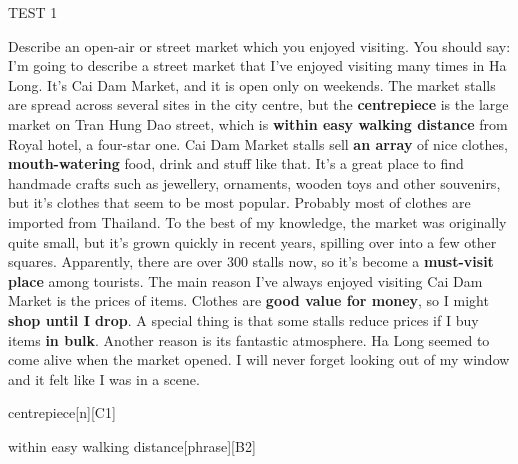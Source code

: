 \begin{glossarymc}[Cambridge 9]
\begin{test}{TEST 1}
\begin{qa}{Describe an open-air or street market which you enjoyed visiting. You should say:}
    I'm going to describe a street market that I've enjoyed visiting many times in Ha Long. It's Cai Dam Market, and it is open only on weekends. The market stalls are spread across several sites in the city centre, but the \textbf{centrepiece} is the large market on Tran Hung Dao street, which is \textbf{within easy walking distance} from Royal hotel, a four-star one. Cai Dam Market stalls sell \textbf{an array} of nice clothes, \textbf{mouth-watering} food, drink and stuff like that. It's a great place to find handmade crafts such as jewellery, ornaments, wooden toys and other souvenirs, but it's clothes that seem to be most popular. Probably most of clothes are imported from Thailand. To the best of my knowledge, the market was originally quite small, but it's grown quickly in recent years, spilling over into a few other squares. Apparently, there are over 300 stalls now, so it's become a \textbf{must-visit place} among tourists. The main reason I've always enjoyed visiting Cai Dam Market is the prices of items. Clothes are \textbf{good value for money}, so I might \textbf{shop until I drop}. A special thing is that some stalls reduce prices if I buy items \textbf{in bulk}. Another reason is its fantastic atmosphere. Ha Long seemed to come alive when the market opened. I will never forget looking out of my window and it felt like I was in a scene.
    \end{qa}

        \begin{VocabExplain}[Part 2]
            \begin{ExplainCard}{centrepiece}[n][C1]
            \end{ExplainCard}

            \begin{ExplainCard}{within easy walking distance}[phrase][B2]
            \end{ExplainCard}


\end{VocabExplain}
\end{test}
\end{glossarymc}
